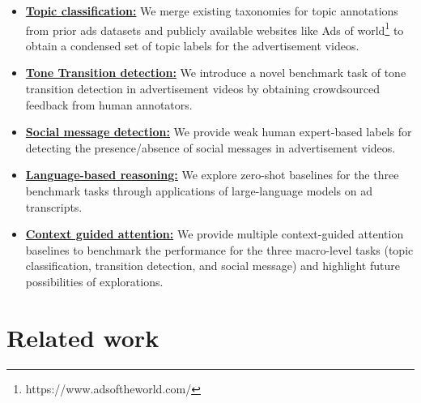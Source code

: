 \begin{itemize}
    \item \textbf{\underline{Topic classification:}} We merge existing taxonomies for topic annotations from prior ads datasets and publicly available websites like {Ads of world}\footnote{https://www.adsoftheworld.com/} to obtain a condensed set of topic labels for the advertisement videos.
    \item \textbf{\underline{Tone Transition detection:}} We introduce a novel benchmark task of tone transition detection in advertisement videos by obtaining crowdsourced feedback from human annotators.
    \item \textbf{\underline{Social message detection:}} We provide weak human expert-based labels for detecting the presence/absence of social messages in advertisement videos.
    \item \textbf{\underline{Language-based reasoning:}} We explore zero-shot baselines for the three benchmark tasks through applications of large-language models on ad transcripts.
    \item \textbf{\underline{Context guided attention:}} We provide multiple context-guided attention baselines to benchmark the performance for the three macro-level tasks (topic classification, transition detection, and social message) and highlight future possibilities of explorations.
\end{itemize}
\section{Related work}

